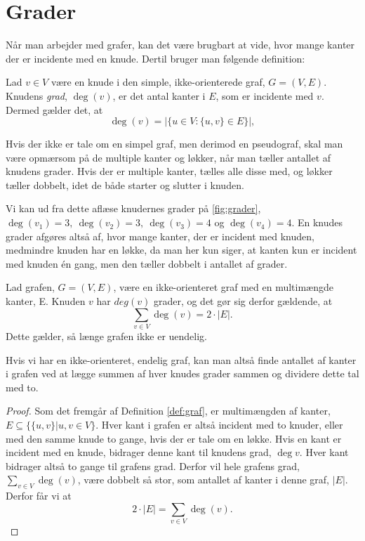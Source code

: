 \section{Grader} \label{sec:grader}
Når man arbejder med grafer, kan det være brugbart at vide, hvor mange kanter der er incidente med en knude. Dertil bruger man følgende definition:

\begin{defn}[Grader] \label{defn:grader}
Lad $v \in V$ være en knude i den simple, ikke-orienterede graf, $G = (V,E)$. Knudens \emph{grad}, $\deg(v)$, er det antal kanter i $E$, som er incidente med $v$. Dermed gælder det, at
\begin{equation}
\deg(v)=|\{u \in V: \{u,v\} \in E \}|,
\end{equation}
\end{defn}

Hvis der ikke er tale om en simpel graf, men derimod en pseudograf, skal man være opmærsom på de multiple kanter og løkker, når man tæller antallet af knudens grader. Hvis der er multiple kanter, tælles alle disse med, og løkker tæller dobbelt, idet de både starter og slutter i knuden.

\begin{exmp} \label{ex:grader}

Vi kan ud fra dette aflæse knudernes grader på \autoref{fig:grader}, $\deg(v_{1})=3, \ \deg(v_{2})=3, \ \deg(v_{3})=4$ og $\deg(v_{4})=4$. En knudes grader afgøres altså af, hvor mange kanter, der er incident med knuden, medmindre knuden har en løkke, da man her kun siger, at kanten kun er incident med knuden én gang, men den tæller dobbelt i antallet af grader.


\end{exmp}

\begin{thm}
Lad grafen, $G = (V,E)$, være en ikke-orienteret graf med en multimængde kanter, E. Knuden $v$ har $deg(v)$ grader, og det gør sig derfor gældende, at
\begin{equation}
	\sum_{v \in V} { } \deg(v) = 2 \cdot |E|.
\end{equation}
Dette gælder, så længe grafen ikke er uendelig.
\end{thm}
Hvis vi har en ikke-orienteret, endelig graf, kan man altså finde antallet af kanter i grafen ved at lægge summen af hver knudes grader sammen og dividere dette tal med to.

\begin{proof}
Som det fremgår af Definition \ref{def:graf}, er multimængden af kanter, $E \subseteq \{\{u,v\}|u,v \in V \}$. Hver kant i grafen er altså incident med to knuder, eller med den samme knude to gange, hvis der er tale om en løkke. Hvis en kant er incident med en knude, bidrager denne kant til knudens grad, $\deg{v}$. Hver kant bidrager altså to gange til grafens grad. Derfor vil hele grafens grad, $\sum_{v \in V} { } \deg(v)$, være dobbelt så stor, som antallet af kanter i denne graf, $|E|$. Derfor får vi at 
\begin{equation}
2 \cdot |E|= \sum_{v \in V} { } \deg(v).
\end{equation} 
\end{proof}

